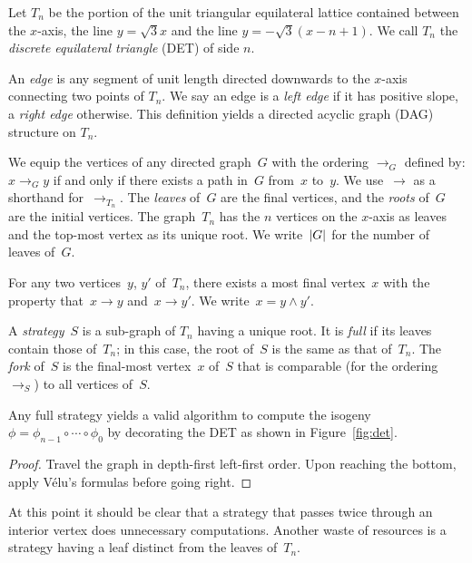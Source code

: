 \def\order{\mathop{\rightarrow}}

\begin{definition}  Let $T_n$ be the portion of the unit triangular equilateral lattice
  contained between the $x$-axis, the line $y=\sqrt{3}x$ and the line
  $y=-\sqrt{3}(x-n+1)$. We call $T_n$ the \emph{discrete equilateral
    triangle} (DET) of side $n$.

  An \emph{edge} is any segment of unit length
  directed downwards to the $x$-axis connecting two points of $T_n$. We say
  an edge is a \emph{left edge} if it has positive slope, a
  \emph{right edge} otherwise. This definition yields a directed acyclic graph
  (DAG) structure on $T_n$.

  We equip the vertices of any directed graph~$G$ with the ordering
  $\order_G$ defined by: $x \order_G y$ if and only if there exists a
  path in~$G$ from~$x$ to~$y$. We use~$\order$ as a shorthand
  for~$\order_{T_n}$. The \emph{leaves} of~$G$ are the final vertices, and
  the \emph{roots} of~$G$ are the initial vertices. The graph~$T_n$ has the
  $n$ vertices on the $x$-axis as leaves and the top-most vertex as its
  unique root. We write~$\left|G\right|$ for the number of leaves of~$G$.

  For any two vertices~$y$, $y'$ of~$T_n$, there exists a most final
  vertex~$x$ with the property that~$x \order y$ and~$x \order y'$. We
  write~$x = y \wedge y'$.

  A \emph{strategy}~$S$ is a sub-graph of $T_n$ having a unique root.
  It is \emph{full} if its leaves contain those of~$T_n$; in this case,
  the root of~$S$ is the same as that of~$T_n$. The \emph{fork} of~$S$ is
  the final-most vertex~$x$ of~$S$ that is comparable (for the
  ordering~$\order_S$) to all vertices of~$S$.
\end{definition}

\begin{lemma}\label{lem:strategy}
  Any full strategy yields a valid algorithm to compute the isogeny
  $\phi=\phi_{n-1}\circ\cdots\circ\phi_0$ by decorating the DET as
  shown in Figure~\ref{fig:det}.
\end{lemma}

\begin{proof}
  Travel the graph in depth-first left-first order. Upon reaching
  the bottom, apply V\'elu's formulas before going right.
\end{proof}

At this point it should be clear that a strategy that passes twice
through an interior vertex does unnecessary computations. Another waste
of resources is a strategy having a leaf distinct from the leaves
of~$T_n$.

